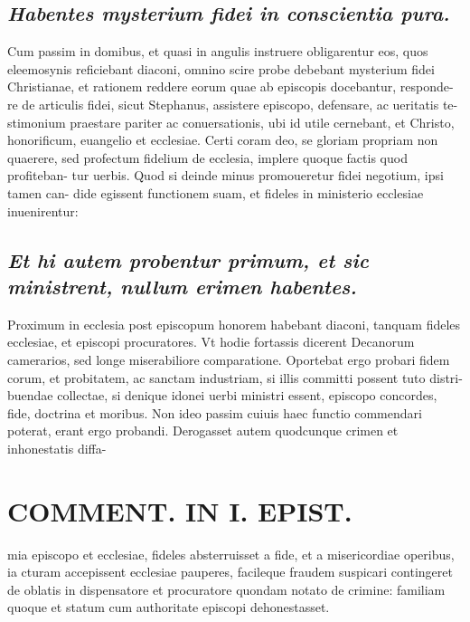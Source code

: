 \documentclass{article}
\begin{document}
\begin{pages}
\subsection*{\textit{Habentes mysterium fidei in conscientia pura. }}\pstart Cum passim in domibus, et quasi in angulis instruere obligarentur eos, quos eleemosynis reficiebant diaconi, omnino scire probe debebant mysterium fidei Christianae, et rationem reddere eorum quae ab episcopis docebantur, responde- re de articulis fidei, sicut Stephanus, assistere episcopo, defensare, ac ueritatis te- stimonium praestare pariter ac conuersationis, ubi id utile cernebant, et Christo, honorificum, euangelio et ecclesiae. Certi coram deo, se gloriam propriam non quaerere, sed profectum fidelium de ecclesia, implere quoque factis quod profiteban- tur uerbis. Quod si deinde minus promoueretur fidei negotium, ipsi tamen can- dide egissent functionem suam, et fideles in ministerio ecclesiae inuenirentur:  \pend
{}
{}
\subsection*{\textit{Et hi autem probentur primum, et sic ministrent, nullum erimen habentes. }}\pstart Proximum in ecclesia post episcopum honorem habebant diaconi, tanquam fideles ecclesiae, et episcopi procuratores. Vt hodie fortassis dicerent Decanorum camerarios, sed longe miserabiliore comparatione. Oportebat ergo probari fidem corum, et probitatem, ac sanctam industriam, si illis committi possent tuto distri- buendae collectae, si denique idonei uerbi ministri essent, episcopo concordes, fide, doctrina et moribus. Non ideo passim cuiuis haec functio commendari poterat, erant ergo probandi. Derogasset autem quodcunque crimen et inhonestatis diffa-  \pend
\section*{COMMENT. IN I. EPIST. }
\marginpar{[ p.500 ]}\pstart mia episcopo et ecclesiae, fideles absterruisset a fide, et a misericordiae operibus, ia cturam accepissent ecclesiae pauperes, facileque fraudem suspicari contingeret de oblatis in dispensatore et procuratore quondam notato de crimine: familiam quoque  et statum cum authoritate episcopi dehonestasset.  \pend
{}
{}

\end{pages}
\end{document}

